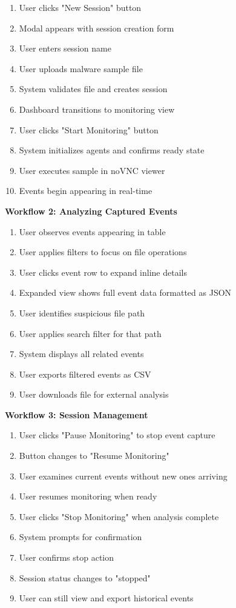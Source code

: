 \begin{enumerate}
    \item User clicks "New Session" button
    \item Modal appears with session creation form
    \item User enters session name
    \item User uploads malware sample file
    \item System validates file and creates session
    \item Dashboard transitions to monitoring view
    \item User clicks "Start Monitoring" button
    \item System initializes agents and confirms ready state
    \item User executes sample in noVNC viewer
    \item Events begin appearing in real-time
\end{enumerate}

\textbf{Workflow 2: Analyzing Captured Events}

\begin{enumerate}
    \item User observes events appearing in table
    \item User applies filters to focus on file operations
    \item User clicks event row to expand inline details
    \item Expanded view shows full event data formatted as JSON
    \item User identifies suspicious file path
    \item User applies search filter for that path
    \item System displays all related events
    \item User exports filtered events as CSV
    \item User downloads file for external analysis
\end{enumerate}

\textbf{Workflow 3: Session Management}

\begin{enumerate}
    \item User clicks "Pause Monitoring" to stop event capture
    \item Button changes to "Resume Monitoring"
    \item User examines current events without new ones arriving
    \item User resumes monitoring when ready
    \item User clicks "Stop Monitoring" when analysis complete
    \item System prompts for confirmation
    \item User confirms stop action
    \item Session status changes to "stopped"
    \item User can still view and export historical events
\end{enumerate}

